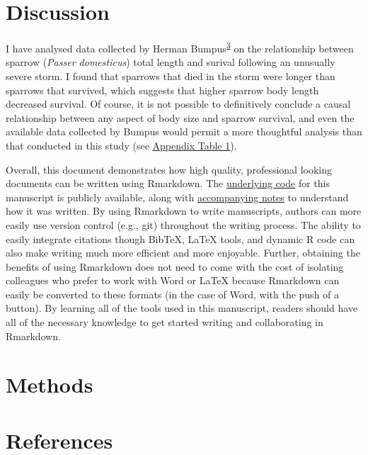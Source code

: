 \documentclass[
]{article}
\begin{document}
\clearpage

\hypertarget{discussion}{%
\section{Discussion}\label{discussion}}

I have analysed data collected by Herman Bumpus\textsuperscript{\protect\hyperlink{ref-Bumpus1898}{3}} on the relationship between sparrow (\emph{Passer domesticus}) total length and surival following an unusually severe storm. I found that sparrows that died in the storm were longer than sparrows that survived, which suggests that higher sparrow body length decreased survival. Of course, it is not possible to definitively conclude a causal relationship between any aspect of body size and sparrow survival, and even the available data collected by Bumpus would permit a more thoughtful analysis than that conducted in this study (see \protect\hyperlink{appendix}{Appendix Table 1}).

Overall, this document demonstrates how high quality, professional looking documents can be written using Rmarkdown. The \href{https://github.com/StirlingCodingClub/Manuscripts_in_Rmarkdown/blob/master/ms.Rmd}{underlying code} for this manuscript is publicly available, along with \href{https://stirlingcodingclub.github.io/Manuscripts_in_Rmarkdown/Rmarkdown_notes.html}{accompanying notes} to understand how it was written. By using Rmarkdown to write manuscripts, authors can more easily use version control (e.g., git) throughout the writing process. The ability to easily integrate citations though BibTeX, LaTeX tools, and dynamic R code can also make writing much more efficient and more enjoyable. Further, obtaining the benefits of using Rmarkdown does not need to come with the cost of isolating colleagues who prefer to work with Word or LaTeX because Rmarkdown can easily be converted to these formats (in the case of Word, with the push of a button). By learning all of the tools used in this manuscript, readers should have all of the necessary knowledge to get started writing and collaborating in Rmarkdown.

\clearpage

\hypertarget{methods}{%
\section{Methods}\label{methods}}

\clearpage

\hypertarget{references}{%
\section{References}\label{references}}
\end{document}
